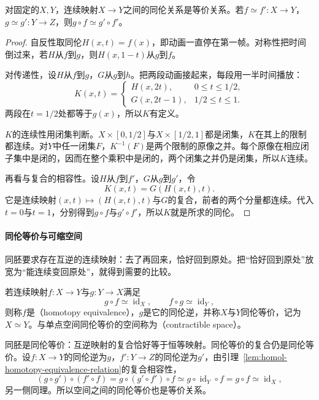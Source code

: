 \begin{lemma}[同伦是等价关系]
\label{lem:homol-homotopy-equivalence-relation}
对固定的$X,Y$，连续映射$X\to Y$之间的同伦关系是等价关系。若$f\simeq f':X\to Y$，$g\simeq g':Y\to Z$，则$g\circ f\simeq g'\circ f'$。
\end{lemma}

\begin{proof}
自反性取同伦$H(x,t)=f(x)$，即动画一直停在第一帧。对称性把时间倒过来，若$H$从$f$到$g$，则$H(x,1-t)$从$g$到$f$。

对传递性，设$H$从$f$到$g$，$G$从$g$到$h$。把两段动画接起来，每段用一半时间播放：
\[
 K(x,t)=\begin{cases}H(x,2t),&0\leq t\leq1/2,\\ G(x,2t-1),&1/2\leq t\leq1.\end{cases}
\]
两段在$t=1/2$处都等于$g(x)$，所以$K$有定义。

$K$的连续性用闭集判断。$X\times[0,1/2]$与$X\times[1/2,1]$都是闭集，$K$在其上的限制都连续。对$Y$中任一闭集$F$，$K^{-1}(F)$是两个限制的原像之并。每个原像在相应闭子集中是闭的，因而在整个乘积中是闭的，两个闭集之并仍是闭集，所以$K$连续。

再看与复合的相容性。设$H$从$f$到$f'$，$G$从$g$到$g'$，令
\[
 K(x,t)=G(H(x,t),t).
\]
它是连续映射$(x,t)\mapsto(H(x,t),t)$与$G$的复合，前者的两个分量都连续。代入$t=0$与$t=1$，分别得到$g\circ f$与$g'\circ f'$，所以$K$就是所求的同伦。
\end{proof}

\paragraph{同伦等价与可缩空间}
同胚要求存在互逆的连续映射：去了再回来，恰好回到原处。把“恰好回到原处”放宽为“能连续变回原处”，就得到需要的比较。

\begin{definition}[同伦等价]
\label{def:homol-homotopy-equivalent}
若连续映射$f:X\to Y$与$g:Y\to X$满足
\begin{equation}
 g\circ f\simeq\operatorname{id}_X,\qquad f\circ g\simeq\operatorname{id}_Y,
 \label{eq:homol-homotopy-equivalence}
\end{equation}
则称$f$是（homotopy equivalence），$g$是它的同伦逆，并称$X$与$Y$同伦等价，记为$X\simeq Y$。与单点空间同伦等价的空间称为（contractible space）。
\end{definition}

同胚是同伦等价：互逆映射的复合恰好等于恒等映射。同伦等价的复合仍是同伦等价。设$f:X\to Y$的同伦逆为$g$，$f':Y\to Z$的同伦逆为$g'$，由引理~\ref{lem:homol-homotopy-equivalence-relation}的复合相容性，
\[
 (g\circ g')\circ(f'\circ f)=g\circ(g'\circ f')\circ f
 \simeq g\circ\operatorname{id}_Y\circ f=g\circ f\simeq\operatorname{id}_X,
\]
另一侧同理。所以空间之间的同伦等价也是等价关系。


